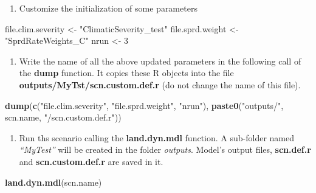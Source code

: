\documentclass[
]{article}
\newenvironment{Shaded}{\begin{snugshade}}{\end{snugshade}}
\newcommand{\DecValTok}[1]{\textcolor[rgb]{0.00,0.00,0.81}{#1}}
\newcommand{\KeywordTok}[1]{\textcolor[rgb]{0.13,0.29,0.53}{\textbf{#1}}}
\newcommand{\NormalTok}[1]{#1}
\newcommand{\StringTok}[1]{\textcolor[rgb]{0.31,0.60,0.02}{#1}}
\providecommand{\tightlist}{%
  \setlength{\itemsep}{0pt}\setlength{\parskip}{0pt}}
\begin{document}
\begin{enumerate}
\def\labelenumi{\arabic{enumi}.}
\setcounter{enumi}{2}
\tightlist
\item
  Customize the initialization of some parameters
\end{enumerate}

\begin{Shaded}
\begin{Highlighting}[]
\NormalTok{file.clim.severity <-}\StringTok{ "ClimaticSeverity_test"}
\NormalTok{file.sprd.weight <-}\StringTok{ "SprdRateWeights_C"}
\NormalTok{nrun <-}\StringTok{ }\DecValTok{3}
\end{Highlighting}
\end{Shaded}

\begin{enumerate}
\def\labelenumi{\arabic{enumi}.}
\setcounter{enumi}{3}
\tightlist
\item
  Write the name of all the above updated parameters in the following
  call of the \textbf{dump} function. It copies these R objects into the
  file \textbf{outputs/MyTst/scn.custom.def.r} (do not change the name
  of this file).
\end{enumerate}

\begin{Shaded}
\begin{Highlighting}[]
\KeywordTok{dump}\NormalTok{(}\KeywordTok{c}\NormalTok{(}\StringTok{"file.clim.severity"}\NormalTok{, }\StringTok{"file.sprd.weight"}\NormalTok{, }\StringTok{"nrun"}\NormalTok{), }
     \KeywordTok{paste0}\NormalTok{(}\StringTok{"outputs/"}\NormalTok{, scn.name, }\StringTok{"/scn.custom.def.r"}\NormalTok{))}
\end{Highlighting}
\end{Shaded}

\begin{enumerate}
\def\labelenumi{\arabic{enumi}.}
\setcounter{enumi}{4}
\tightlist
\item
  Run ths scenario calling the \textbf{land.dyn.mdl} function. A
  sub-folder named \emph{``MyTest''} will be created in the folder
  \emph{outputs}. Model's output files, \textbf{scn.def.r} and
  \textbf{scn.custom.def.r} are saved in it.
\end{enumerate}

\begin{Shaded}
\begin{Highlighting}[]
\KeywordTok{land.dyn.mdl}\NormalTok{(scn.name)}
\end{Highlighting}
\end{Shaded}
\end{document}

